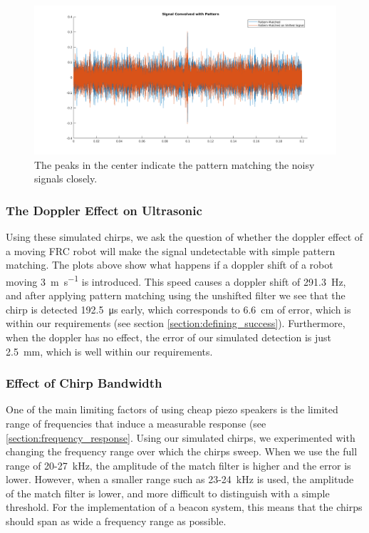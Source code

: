 \documentclass{article}
\begin{document}
    \begin{figure}
      \centering
      \includegraphics[width=1\linewidth]{./images/pattern_matching.png}
      \caption{The peaks in the center indicate the pattern matching the noisy signals closely.}
      \label{fig:pattern_matching}
    \end{figure}

    \subsubsection{The Doppler Effect on Ultrasonic}


      Using these simulated chirps, we ask the question of whether the doppler effect of a moving FRC robot will make the signal undetectable with simple pattern matching. The plots above show what happens if a doppler shift of a robot moving \SI{3}{\meter\per\second} is introduced. This speed causes a doppler shift of \SI{291.3}{\hertz}, and after applying pattern matching using the unshifted filter we see that the chirp is detected \SI{192.5}{\micro\second} early, which corresponds to \SI{6.6}{\centi\meter} of error, which is within our requirements (see section \ref{section:defining_success}). Furthermore, when the doppler has no effect, the error of our simulated detection is just \SI{2.5}{\milli\meter}, which is well within our requirements.

    \subsubsection{Effect of Chirp Bandwidth}

      One of the main limiting factors of using cheap piezo speakers is the limited range of frequencies that induce a measurable response (see \ref{section:frequency_response}. Using our simulated chirps, we experimented with changing the frequency range over which the chirps sweep. When we use the full range of 20-27\SI{}{\kilo\hertz}, the amplitude of the match filter is higher and the error is lower. However, when a smaller range such as 23-24\SI{}{\kilo\hertz} is used, the amplitude of the match filter is lower, and more difficult to distinguish with a simple threshold. For the implementation of a beacon system, this means that the chirps should span as wide a frequency range as possible.
\end{document}
